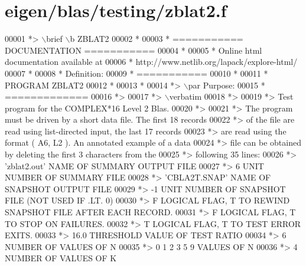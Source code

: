 \hypertarget{eigen_2blas_2testing_2zblat2_8f_source}{}\section{eigen/blas/testing/zblat2.f}
\label{eigen_2blas_2testing_2zblat2_8f_source}

\begin{DoxyCode}
00001 \textcolor{comment}{*> \(\backslash\)brief \(\backslash\)b ZBLAT2}
00002 \textcolor{comment}{*}
00003 \textcolor{comment}{*  =========== DOCUMENTATION ===========}
00004 \textcolor{comment}{*}
00005 \textcolor{comment}{* Online html documentation available at }
00006 \textcolor{comment}{*            http://www.netlib.org/lapack/explore-html/ }
00007 \textcolor{comment}{*}
00008 \textcolor{comment}{*  Definition:}
00009 \textcolor{comment}{*  ===========}
00010 \textcolor{comment}{*}
00011 \textcolor{comment}{*       PROGRAM ZBLAT2}
00012 \textcolor{comment}{* }
00013 \textcolor{comment}{*}
00014 \textcolor{comment}{*> \(\backslash\)par Purpose:}
00015 \textcolor{comment}{*  =============}
00016 \textcolor{comment}{*>}
00017 \textcolor{comment}{*> \(\backslash\)verbatim}
00018 \textcolor{comment}{*>}
00019 \textcolor{comment}{*> Test program for the COMPLEX*16       Level 2 Blas.}
00020 \textcolor{comment}{*>}
00021 \textcolor{comment}{*> The program must be driven by a short data file. The first 18 records}
00022 \textcolor{comment}{*> of the file are read using list-directed input, the last 17 records}
00023 \textcolor{comment}{*> are read using the format ( A6, L2 ). An annotated example of a data}
00024 \textcolor{comment}{*> file can be obtained by deleting the first 3 characters from the}
00025 \textcolor{comment}{*> following 35 lines:}
00026 \textcolor{comment}{*> 'zblat2.out'      NAME OF SUMMARY OUTPUT FILE}
00027 \textcolor{comment}{*> 6                 UNIT NUMBER OF SUMMARY FILE}
00028 \textcolor{comment}{*> 'CBLA2T.SNAP'     NAME OF SNAPSHOT OUTPUT FILE}
00029 \textcolor{comment}{*> -1                UNIT NUMBER OF SNAPSHOT FILE (NOT USED IF .LT. 0)}
00030 \textcolor{comment}{*> F        LOGICAL FLAG, T TO REWIND SNAPSHOT FILE AFTER EACH RECORD.}
00031 \textcolor{comment}{*> F        LOGICAL FLAG, T TO STOP ON FAILURES.}
00032 \textcolor{comment}{*> T        LOGICAL FLAG, T TO TEST ERROR EXITS.}
00033 \textcolor{comment}{*> 16.0     THRESHOLD VALUE OF TEST RATIO}
00034 \textcolor{comment}{*> 6                 NUMBER OF VALUES OF N}
00035 \textcolor{comment}{*> 0 1 2 3 5 9       VALUES OF N}
00036 \textcolor{comment}{*> 4                 NUMBER OF VALUES OF K}

\end{DoxyCode}
